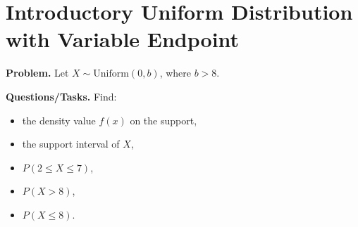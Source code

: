 \section{Introductory Uniform Distribution with Variable Endpoint}

\textbf{Problem.}
Let $X\sim \text{Uniform}(0,b)$, where $b>8$.

\textbf{Questions/Tasks.}
Find:
\begin{itemize}
	\item[(a)] the density value $f(x)$ on the support,
	\item[(b)] the support interval of $X$,
	\item[(c)] $P(2\le X\le 7)$,
	\item[(d)] $P(X>8)$,
	\item[(e)] $P(X\le 8)$.
\end{itemize}

